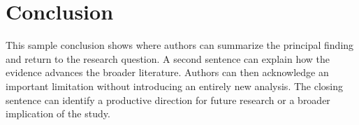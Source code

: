 \section{Conclusion} 
\label{sec:conclusion}

This sample conclusion shows where authors can summarize the principal finding and return to the research question. A second sentence can explain how the evidence advances the broader literature. Authors can then acknowledge an important limitation without introducing an entirely new analysis. The closing sentence can identify a productive direction for future research or a broader implication of the study.
